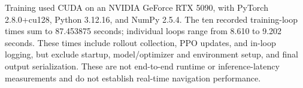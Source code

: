 Training used CUDA on an NVIDIA GeForce RTX 5090, with PyTorch 2.8.0+cu128, Python 3.12.16, and NumPy 2.5.4. The ten recorded training-loop times sum to 87.453875 seconds; individual loops range from 8.610 to 9.202 seconds. These times include rollout collection, PPO updates, and in-loop logging, but exclude startup, model/optimizer and environment setup, and final output serialization. These are not end-to-end runtime or inference-latency measurements and do not establish real-time navigation performance.
